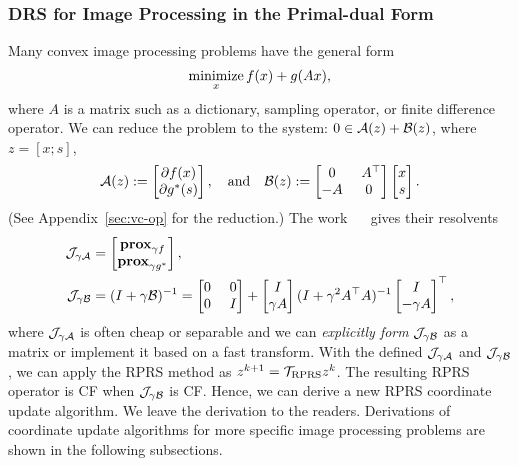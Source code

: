 \subsubsection{DRS for Image Processing in the Primal-dual Form \cite{o2014primal}}
Many convex image processing problems have the general form
$$\operatorname*{minimize}_{x} f(x) + g(Ax),$$
where $A$ is a matrix such as a dictionary, sampling operator, or finite difference operator. We can reduce the problem to the system: $0\in{\mathcal{A}}(z) + {\mathcal{B}}(z)$, where $z=[x;s]$,
$$\cA(z):=\begin{bmatrix}\partial f(x)\\\partial g^*(s)\end{bmatrix},\quad\mbox{and}\quad \cB(z):=\begin{bmatrix}0 & ~A^\top  \\ -A & 0\end{bmatrix}\begin{bmatrix}x\\s\end{bmatrix}.$$
(See Appendix~\ref{sec:vc-op} for the reduction.) The work \mbox{%
\cite{o2014primal} }%
gives their resolvents    
\begin{align*}\cJ_{\gamma \cA} &= \begin{bmatrix}\prox_{\gamma f}\\\prox_{\gamma g^*}\end{bmatrix},\\ 
\cJ_{\gamma \cB} &= (I+\gamma \cB)^{-1}= \begin{bmatrix} 0 &~ 0 \\ 0 &~ I\end{bmatrix}+\begin{bmatrix}I\\ \gamma A\end{bmatrix}(I+\gamma^2 A^\top A)^{-1}\begin{bmatrix}I\\ -\gamma A\end{bmatrix}^\top ,
\end{align*}
where ${\mathcal{J}}_{\gamma {\mathcal{A}}}$ is often cheap or separable and we can \emph{explicitly form}  ${\mathcal{J}}_{\gamma {\mathcal{B}}}$  as a matrix or implement it based on a fast transform. With the defined ${\mathcal{J}}_{\gamma {\mathcal{A}}}$ and ${\mathcal{J}}_{\gamma {\mathcal{B}}}$, we can apply the RPRS method as $z^{k+1} = {\mathcal{T}}_{\text{RPRS}} z^k$. The resulting RPRS operator is CF when ${\mathcal{J}}_{\gamma {\mathcal{B}}}$ is CF. Hence, we can derive a new RPRS coordinate update algorithm. We leave the derivation to the readers. Derivations of coordinate update algorithms for more specific image processing problems are shown in the following subsections.

